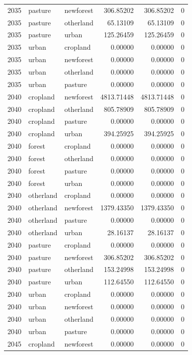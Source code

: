 \documentclass[
]{article}
\begin{document}
\begin{longtable}[]{@{}rllrrr@{}}
2035 & pasture & newforest & 306.85202 & 306.85202 & 0 \\
2035 & pasture & otherland & 65.13109 & 65.13109 & 0 \\
2035 & pasture & urban & 125.26459 & 125.26459 & 0 \\
2035 & urban & cropland & 0.00000 & 0.00000 & 0 \\
2035 & urban & newforest & 0.00000 & 0.00000 & 0 \\
2035 & urban & otherland & 0.00000 & 0.00000 & 0 \\
2035 & urban & pasture & 0.00000 & 0.00000 & 0 \\
2040 & cropland & newforest & 4813.71448 & 4813.71448 & 0 \\
2040 & cropland & otherland & 805.78909 & 805.78909 & 0 \\
2040 & cropland & pasture & 0.00000 & 0.00000 & 0 \\
2040 & cropland & urban & 394.25925 & 394.25925 & 0 \\
2040 & forest & cropland & 0.00000 & 0.00000 & 0 \\
2040 & forest & otherland & 0.00000 & 0.00000 & 0 \\
2040 & forest & pasture & 0.00000 & 0.00000 & 0 \\
2040 & forest & urban & 0.00000 & 0.00000 & 0 \\
2040 & otherland & cropland & 0.00000 & 0.00000 & 0 \\
2040 & otherland & newforest & 1379.43350 & 1379.43350 & 0 \\
2040 & otherland & pasture & 0.00000 & 0.00000 & 0 \\
2040 & otherland & urban & 28.16137 & 28.16137 & 0 \\
2040 & pasture & cropland & 0.00000 & 0.00000 & 0 \\
2040 & pasture & newforest & 306.85202 & 306.85202 & 0 \\
2040 & pasture & otherland & 153.24998 & 153.24998 & 0 \\
2040 & pasture & urban & 112.64550 & 112.64550 & 0 \\
2040 & urban & cropland & 0.00000 & 0.00000 & 0 \\
2040 & urban & newforest & 0.00000 & 0.00000 & 0 \\
2040 & urban & otherland & 0.00000 & 0.00000 & 0 \\
2040 & urban & pasture & 0.00000 & 0.00000 & 0 \\
2045 & cropland & newforest & 0.00000 & 0.00000 & 0 \\

\end{longtable}
\end{document}
